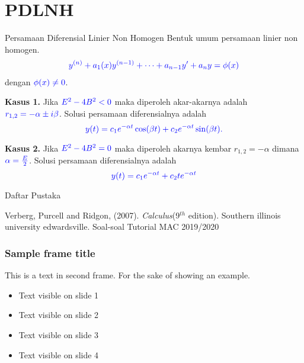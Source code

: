 \documentclass{beamer}
\begin{document}
\section{PDLNH}
\begin{frame}{Persamaan Diferensial Linier Non Homogen}
	Bentuk umum persamaan linier non homogen.
	\begin{align*}
	\color{blue} y^{(n)}+a_1(x)y^{(n-1)}+\cdots+a_{n-1}y'+a_ny=\phi(x)
	\end{align*}
	dengan $\color{blue}\phi(x)\neq 0$. 
\end{frame}


\begin{frame}
	\textbf{Kasus 1.} Jika $\color{blue}E^2-4B^2<0$ maka diperoleh akar-akarnya adalah $\color{blue}r_{1,2}=-\alpha\pm i\beta$. Solusi persamaan diferensialnya adalah
	$$\color{blue}y(t)=c_1e^{-\alpha t}\cos(\beta t)+c_2e^{-\alpha t}\sin(\beta t).$$
\end{frame}
\begin{frame}
	\textbf{Kasus 2.} Jika $\color{blue}E^2-4B^2=0$ maka diperoleh akarnya kembar $r_{1,2}=-\alpha$ dimana $\color{blue}\alpha=\frac{E}{2}$. Solusi persamaan diferensialnya adalah
	$$\color{blue}y(t)=c_1e^{-\alpha t}+c_2te^{-\alpha t}$$
\end{frame}

\begin{frame}{Daftar Pustaka}
	\begin{thebibliography}{9}
		Verberg, Purcell and Ridgon, (2007). \textit{Calculus}(9$^{th}$ edition). Southern illinois university edwardsville.
		Soal-soal Tutorial MAC 2019/2020
	\end{thebibliography}
\end{frame}


\newpage
\begin{frame}
\frametitle{Sample frame title}
This is a text in second frame. 
For the sake of showing an example.

\begin{itemize}
	\item<1-> Text visible on slide 1
	\item<2-> Text visible on slide 2
	\item<3> Text visible on slide 3
	\item<4-> Text visible on slide 4
\end{itemize}

\end{frame}
\end{document}
